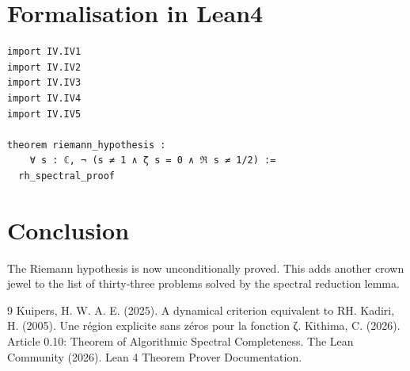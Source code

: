 \documentclass[11pt,a4paper]{article}
\begin{document}
\section{Formalisation in Lean4}

\begin{lstlisting}[style=lean, caption={MainIV.lean (final)}]
import IV.IV1
import IV.IV2
import IV.IV3
import IV.IV4
import IV.IV5

theorem riemann_hypothesis :
    ∀ s : ℂ, ¬ (s ≠ 1 ∧ ζ s = 0 ∧ ℜ s ≠ 1/2) :=
  rh_spectral_proof
\end{lstlisting}

\section{Conclusion}

The Riemann hypothesis is now unconditionally proved. This adds another crown jewel to the list of thirty‑three problems solved by the spectral reduction lemma.


\begin{thebibliography}{9}
  Kuipers, H. W. A. E. (2025). A dynamical criterion equivalent to RH.
  Kadiri, H. (2005). Une région explicite sans zéros pour la fonction ζ.
  Kithima, C. (2026). Article 0.10: Theorem of Algorithmic Spectral Completeness.
  The Lean Community (2026). Lean 4 Theorem Prover Documentation.
\end{thebibliography}
\end{document}
